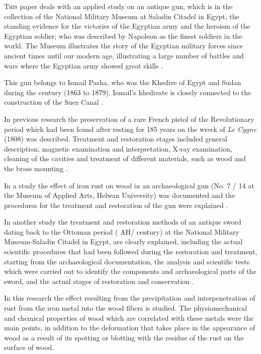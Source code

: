 	
\lettrine[nindent=0em,lines=3]{T}{his} paper deals with an applied study on an antique gun, which is in the collection of the National Military Museum at Saladin Citadel in Egypt, the standing evidence for the victories of the Egyptian army and the heroism of the Egyptian soldier; who was described by Napoleon as the finest soldiers in the world. The Museum illustrates the story of the Egyptian military forces since ancient times until our modern age, illustrating a large number of battles and wars where the Egyptian army showed great skills \parencite{Seaman_2013}.
	
	This gun belongs to Ismail Pasha, who was the Khedive of Egypt and Sudan during the  century (1863 to 1879). Ismail's khedivate is closely connected to the construction of the Suez Canal \parencite[49--55]{Dye_1880}. 
	
	In previous research the preservation of a rare French pistol of the Revolutionary period which had been found after resting for 185 years on the wreck of \emph{Le Cygne} (1808) was described. 
Treatment and restoration stages included general description, magnetic examination and interpretation, X-ray examination, cleaning of the cavities and treatment of different materials, such as wood and the brass mounting \parencite[161-169]{Mardikian_1996}. 
	
	In a study the effect of iron rust on wood in an archaeological gun (No. 7 / 14 at the Museum of Applied Arts, Helwan University) was documented and the procedures for the treatment and restoration of the gun were explained \parencites[285--290]{AboElgat_2010}[348--353]{Zidan_2011}.
	
	In another study the treatment and restoration methods of an antique sword dating back to the Ottoman period ( AH/ century\AD) at the National Military Museum-Saladin Citadel in Egypt, are clearly explained, including the actual scientific procedures that had been followed during the restoration and treatment, starting from the archaeological documentation, the analysis and scientific tests which were carried out to identify the components and archaeological parts of the sword, and the actual stages of restoration and conservation \parencite[1--6]{Zidan_2013}.
	
	In this research the effect resulting from the precipitation and interpenetration of rust from the iron metal into the wood fibers is studied. The physiomechanical and chemical properties of wood which are correlated with these metals were the main points, in addition to the deformation that takes place in the appearance of wood as a result of its spotting or blotting with the residue of the rust on the surface of wood.  
	
